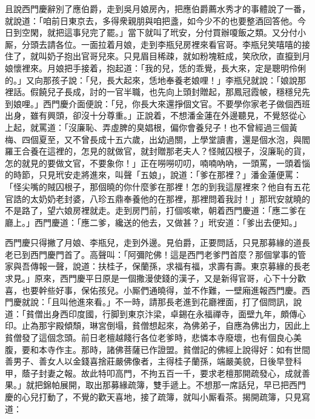 且說西門慶辭別了應伯爵，走到吳月娘房內，把應伯爵薦水秀才的事體說了一番，就說道：「咱前日東京去，多得衆親朋與咱把盞，如今少不的也要整酒回答他。今日到空閑，就把這事兒完了罷。」當下就叫了玳安，分付買辦嗄飯之類。又分付小厮，分頭去請各位。一面拉着月娘，走到李瓶兒房裡來看官哥。李瓶兒笑嘻嘻的接住了，就叫奶子抱出官哥兒來。只見眉目稀疎，就如粉塊粧成，笑欣欣，直攛到月娘懷裡來。月娘把手接着，抱起道：「我的兒，恁的乖覺，長大來，定是聰明伶俐的。」又向那孩子說：「兒，長大起來，恁地奉養老娘哩！」李瓶兒就說：「娘說那裡話。假饒兒子長成，討的一官半職，也先向上頭封贈起，那鳳冠霞帔，穩穩兒先到娘哩。」{}西門慶介面便說：「兒，你長大來還掙個文官。不要學你家老子做個西班出身，雖有興頭，卻沒十分尊重。」{}正說着，不想潘金蓮在外邊聽見，不覺怒從心上起，{}就罵道：「沒廉恥、弄虛脾的臭娼根，偏你會養兒子！也不曾經過三個黃梅、四個夏至，又不曾長成十五六歲，出幼過關，上學堂讀書，還是個水泡，與閻羅王合養在這裡的，怎見的就做官，就封贈那老夫人？怪賊囚根子，沒廉恥的貨，怎的就見的要做文官，不要象你！」{}正在嘮嘮叨叨，喃喃吶吶，一頭罵，一頭着惱的時節，只見玳安走將進來，叫聲「五娘」，說道：「爹在那裡？」潘金蓮便罵：「怪尖嘴的賊囚根子，那個曉的你什麼爹在那裡！怎的到我這屋裡來？他自有五花官誥的太奶奶老封婆，八珍五鼎奉養他的在那裡，{}那裡問着我討！」那玳安就曉的不是路了，望六娘房裡就走。{}走到房門前，打個咳嗽，朝着西門慶道：「應二爹在廳上。」西門慶道：「應二爹，纔送的他去，又做甚？」玳安道：「爹出去便知。」

西門慶只得撇了月娘、李瓶兒，走到外邊。見伯爵，正要問話，只見那募緣的道長老已到西門慶門首了。高聲叫：「阿彌陀佛！這是西門老爹門首麼？那個掌事的管家與吾傳報一聲，說道：扶桂子，保蘭孫，求福有福，求壽有壽。{}東京募緣的長老求見。」原來，西門慶平日原是一個撒漫使錢的漢子，又是新得官哥，心下十分歡喜，也要幹些好事，保佑孩兒。小厮們通曉得，並不作難，一壁廂進報西門慶。西門慶就說：「且叫他進來看。」不一時，請那長老進到花廳裡面，打了個問訊，說道：「貧僧出身西印度國，行脚到東京汴梁，卓錫在永福禪寺，面壁九年，頗傳心印。止為那宇殿傾頹，琳宮倒塌，貧僧想起來，為佛弟子，自應為佛出力，因此上貧僧發了這個念頭。前日老檀越餞行各位老爹時，悲憐本寺廢壞，也有個良心美腹，要和本寺作主。那時，諸佛菩薩已作證盟。貧僧記的佛經上說得好：如有世間善男子、善女人以金錢喜捨莊嚴佛像者，主得桂子蘭孫，端嚴美貌，日後早登科甲，蔭子封妻之報。故此特叩高門，不拘五百一千，要求老檀那開疏發心，成就善果。」就把錦帕展開，取出那募緣疏簿，雙手遞上。不想那一席話兒，早已把西門慶的心兒打動了，不覺的歡天喜地，{}接了疏簿，就叫小厮看茶。揭開疏簿，只見寫道：

